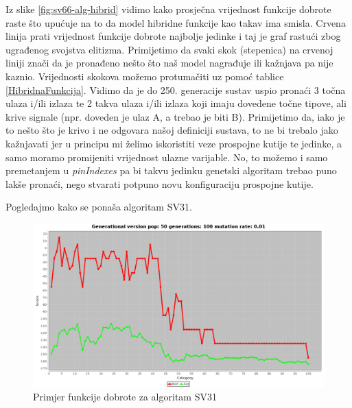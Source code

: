 \documentclass[times, utf8, zavrsni]{fer}
\begin{document}
Iz slike \ref{fig:sv66-alg-hibrid} vidimo kako prosječna vrijednost funkcije dobrote raste što upućuje na to da model hibridne funkcije kao takav ima smisla. Crvena linija prati vrijednost funkcije dobrote najbolje jedinke i taj je graf rastući zbog ugrađenog svojstva elitizma. Primijetimo da svaki skok (stepenica) na crvenoj liniji znači da je pronađeno nešto što naš model nagrađuje ili kažnjava pa nije kaznio. Vrijednosti skokova možemo protumačiti uz pomoć tablice \ref{HibridnaFunkcija}. Vidimo da je do 250. generacije sustav uspio pronaći 3 točna ulaza i/ili izlaza te 2 takva ulaza i/ili izlaza koji imaju dovedene točne tipove, ali krive signale (npr. doveden je ulaz A, a trebao je biti B). Primijetimo da, iako je to nešto što je krivo i ne odgovara našoj definiciji sustava, to ne bi trebalo jako kažnjavati jer u principu mi želimo iskoristiti veze prospojne kutije te jedinke, a samo moramo promijeniti vrijednost ulazne varijable. No, to možemo i samo premetanjem u \emph{pinIndexes} pa bi takvu jedinku genetski algoritam trebao puno lakše pronaći, nego stvarati potpuno novu konfiguraciju prospojne kutije. 

Pogledajmo kako se ponaša algoritam SV31. 

\begin{figure}[H]
	\centering
	\includegraphics[width=18cm]{slike/SV31Hibrid.png}
	\caption{Primjer funkcije dobrote za algoritam SV31}
	\label{fig:sv31-alg-hibrid}
\end{figure} 
\end{document}
